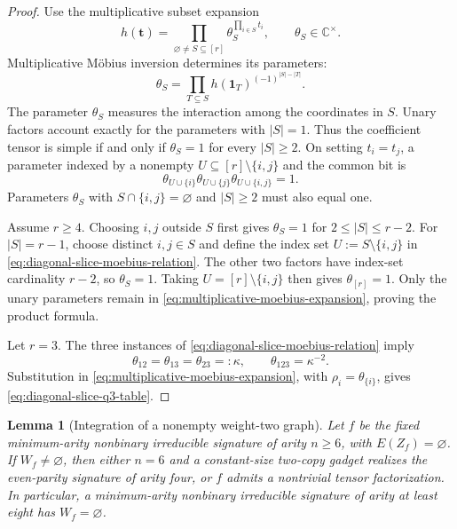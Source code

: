 \documentclass[11pt,letterpaper,onecolumn]{article}
\theoremstyle{plain}
\newtheorem{lemma}[lemma]{Lemma}
\theoremstyle{definition}
\theoremstyle{remark}
\newcommand{\one}{\mathbf 1}
\begin{document}
\begin{proof}
Use the multiplicative subset expansion
\begin{equation}
  h({\mathbf t})=\prod_{\varnothing\ne S\subseteq[r]}
       \theta_S^{\prod_{i\in S}t_i},
   \qquad \theta_S\in\mathbb C^\times.
  \label{eq:multiplicative-moebius-expansion}
\end{equation}
Multiplicative M\"obius inversion determines its parameters:
\[
  \theta_S
  =\prod_{T\subseteq S}h(\one_T)^{(-1)^{|S|-|T|}}.
\]
The parameter \(\theta_S\) measures the interaction among the coordinates
in \(S\). Unary factors account exactly for the parameters with
\(|S|=1\).  Thus the coefficient tensor is simple if and only if
\(\theta_S=1\) for every \(|S|\ge2\).  On setting \(t_i=t_j\), a parameter indexed by a
nonempty \(U\subseteq[r]\setminus\{i,j\}\) and the common bit is
\begin{equation}
  \theta_{U\cup\{i\}}
  \theta_{U\cup\{j\}}
  \theta_{U\cup\{i,j\}}=1.
  \label{eq:diagonal-slice-moebius-relation}
\end{equation}
Parameters \(\theta_S\) with \(S\cap\{i,j\}=\varnothing\) and
\(|S|\ge2\) must also equal one.

Assume \(r\ge4\).  Choosing \(i,j\) outside \(S\) first gives
\(\theta_S=1\) for \(2\le|S|\le r-2\).  For \(|S|=r-1\), choose distinct
\(i,j\in S\) and define the index set \(U:=S\setminus\{i,j\}\) in
\cref{eq:diagonal-slice-moebius-relation}. The other two factors have
index-set cardinality \(r-2\), so \(\theta_S=1\).  Taking
\(U=[r]\setminus\{i,j\}\) then gives \(\theta_{[r]}=1\).  Only the unary
parameters remain in \cref{eq:multiplicative-moebius-expansion}, proving
the product formula.

Let \(r=3\).  The three instances of
\cref{eq:diagonal-slice-moebius-relation} imply
\[
  \theta_{12}=\theta_{13}=\theta_{23}=:\kappa,
  \qquad \theta_{123}=\kappa^{-2}.
\]
Substitution in \cref{eq:multiplicative-moebius-expansion}, with
\(\rho_i=\theta_{\{i\}}\), gives
\cref{eq:diagonal-slice-q3-table}.
\end{proof}

\begin{lemma}[Integration of a nonempty weight-two graph]
\label{lem:rm-weight-two-integration}
Let \(f\) be the fixed minimum-arity nonbinary irreducible signature of arity \(n\ge6\), with
\(E(Z_f)=\varnothing\).  If \(W_f\ne\varnothing\), then either \(n=6\) and a
constant-size two-copy gadget realizes the even-parity signature of arity
four, or \(f\) admits a nontrivial tensor factorization.  In particular, a
minimum-arity nonbinary irreducible signature of arity
at least eight has \(W_f=\varnothing\).
\end{lemma}
\end{document}
